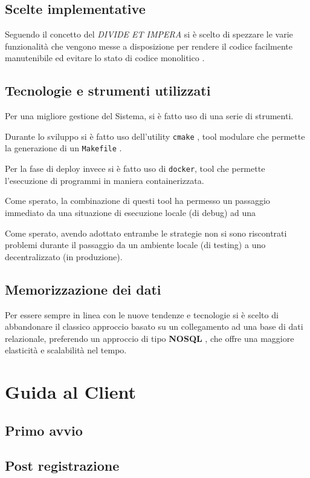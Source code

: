 \documentclass[letterpaper, 11pt]{article}
\begin{document}
\subsection{Scelte implementative}
\label{Guida al Server - Scelte implementative}
Seguendo il concetto del \emph{DIVIDE ET IMPERA} \autocite{DIVIDE_ET_IMPERA} si è scelto di spezzare le varie funzionalità che vengono messe a disposizione per rendere il codice facilmente manutenibile ed evitare lo stato di codice monolitico \autocite{MONOLITICO}.
\subsection{Tecnologie e strumenti utilizzati}
\label{Guida al Server -}
Per una migliore gestione del Sistema, si è fatto uso di una serie di strumenti.

Durante lo sviluppo si è fatto uso dell'utility \texttt{cmake} \autocite{CMAKE} , tool modulare che permette la generazione di un \texttt{Makefile} \autocite{MAKEFILE} .

Per la fase di deploy invece si è fatto uso di \texttt{docker}, tool che permette l'esecuzione di programmi in maniera containerizzata.

Come sperato, la combinazione di questi tool ha permesso un passaggio immediato da una situazione di esecuzione locale (di debug) ad una 

Come sperato, avendo adottato entrambe le strategie non si sono riscontrati problemi durante il passaggio da un ambiente locale (di testing) a uno decentralizzato (in produzione).
\subsection{Memorizzazione dei dati}
\label{Guida al Server - Memorizzazione dei dati}
Per essere sempre in linea con le nuove tendenze e tecnologie si è scelto di abbandonare il classico approccio basato su un collegamento ad una base di dati relazionale, preferendo un approccio di tipo \textbf{NOSQL} \autocite{RefNoSQL} , che offre una maggiore elasticità e scalabilità nel tempo.
\section{Guida al Client}
\label{Guida al Client}
\subsection{Primo avvio}
\label{Guida al Client - Primo avvio}
\subsection{Post registrazione}
\label{Guida al Client - Post registrazione}
\end{document}
